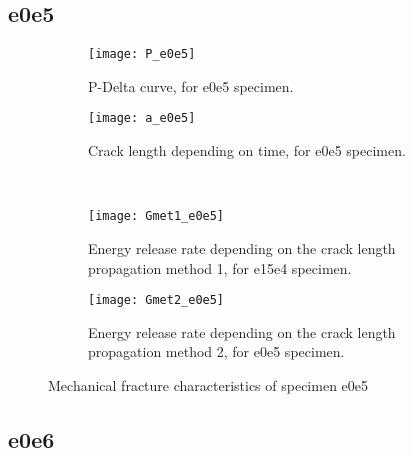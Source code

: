 \subsection{e0e5}

\begin{figure}[H]
	\centering
	\begin{subfigure}{0.48\linewidth}
		\centering
		\texttt{[image: P\_e0e5]}
		\decoRule
		\caption{P-Delta curve, for e0e5 specimen.}
		\label{fig:P_e0e5}
	\end{subfigure}
	\hfill 
	\begin{subfigure}{0.48\linewidth}
		\centering
		\texttt{[image: a\_e0e5]}
		\decoRule
		\caption{Crack length depending on time, for e0e5 specimen.}
		\label{fig:a_e0e5}
	\end{subfigure}
	\hfill\\
	\begin{subfigure}{0.48\linewidth}
		\centering
		\texttt{[image: Gmet1\_e0e5]}
		\decoRule
		\caption{Energy release rate depending on the crack length propagation method 1, for e15e4 specimen.}
		\label{fig:Gmet1_e0e5}
	\end{subfigure}
	\hfill
	\begin{subfigure}{0.48\linewidth}
		\centering
		\texttt{[image: Gmet2\_e0e5]}
		\decoRule
		\caption{Energy release rate depending on the crack length propagation method 2, for e0e5 specimen.}
		\label{fig:Gmet2_e0e5}
	\end{subfigure}
	\caption{Mechanical fracture characteristics of specimen e0e5}
	\label{E1o_a}
\end{figure}

\subsection{e0e6}

